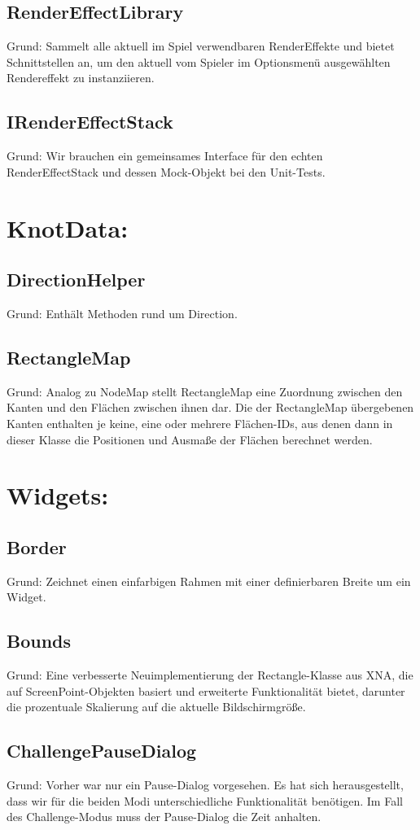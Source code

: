 \subsection{RenderEffectLibrary}
Grund: Sammelt alle aktuell im Spiel verwendbaren RenderEffekte und bietet Schnittstellen an, um den aktuell vom Spieler im Optionsmenü ausgewählten Rendereffekt zu instanziieren.
\subsection{IRenderEffectStack}
Grund: Wir brauchen ein gemeinsames Interface für den echten RenderEffectStack und dessen Mock-Objekt bei den Unit-Tests.

\section{KnotData:}
\subsection{DirectionHelper}
Grund: Enthält Methoden rund um Direction.
\subsection{RectangleMap}
Grund: Analog zu NodeMap stellt RectangleMap eine Zuordnung zwischen den Kanten und den Flächen zwischen ihnen dar. Die der RectangleMap übergebenen Kanten enthalten je keine, eine oder mehrere Flächen-IDs, aus denen dann in dieser Klasse die Positionen und Ausmaße der Flächen berechnet werden. 

\section{Widgets:}
\subsection{Border}
Grund: Zeichnet einen einfarbigen Rahmen mit einer definierbaren Breite um ein Widget.
\subsection{Bounds}
Grund: Eine verbesserte Neuimplementierung der Rectangle-Klasse aus XNA, die auf ScreenPoint-Objekten basiert und erweiterte Funktionalität bietet, darunter die prozentuale Skalierung auf die aktuelle Bildschirmgröße.
\subsection{ChallengePauseDialog}
Grund: Vorher war nur ein Pause-Dialog vorgesehen. Es hat sich herausgestellt, dass wir für die beiden Modi unterschiedliche Funktionalität benötigen. Im Fall des Challenge-Modus muss der Pause-Dialog die Zeit anhalten.
